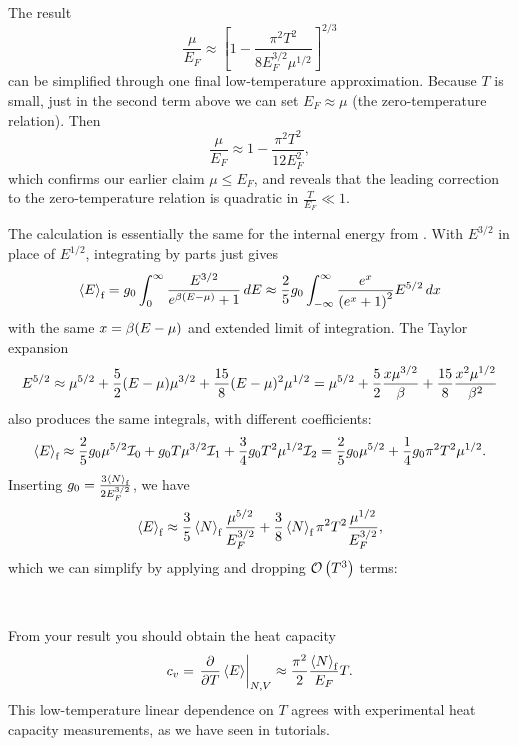 The result
\begin{equation*}
  \frac{\mu}{E_F} \approx \left[1 - \frac{\pi^2 T^2}{8 E_F^{3 / 2} \mu^{1 / 2}}\right]^{2 / 3}
\end{equation*}
can be simplified through one final low-temperature approximation.
Because $T$ is small, just in the second term above we can set $E_F \approx \mu$ (the zero-temperature relation).
Then
\begin{equation}
  \label{eq:mu_vs_T}
  \frac{\mu}{E_F} \approx 1 - \frac{\pi^2 T^2}{12 E_F^2},
\end{equation}
which confirms our earlier claim $\mu \leq E_F$, and reveals that the leading correction to the zero-temperature relation is quadratic in $\frac{T}{E_F} \ll 1$.

The calculation is essentially the same for the internal energy from .
With $E^{3 / 2}$ in place of $E^{1 / 2}$, integrating by parts just gives
\begin{equation*}
  \left\langle E \right\rangle_{\text{f}} = g_0 \int_0^{\infty} \frac{E^{3 / 2}}{e^{\beta(E - \mu)} + 1} \mathop{dE} \approx \frac{2}{5} g_0 \int_{-\infty}^{\infty} \frac{e^x}{\left(e^x + 1\right)^2} E^{5 / 2} \mathop{dx}
\end{equation*}
with the same $x = \beta(E - \mu)$ and extended limit of integration.
The Taylor expansion
\begin{equation*}
  E^{5 / 2} \approx \mu^{5 / 2} + \frac{5}{2} (E - \mu) \mu^{3 / 2} + \frac{15}{8} (E - \mu)^2 \mu^{1 / 2} = \mu^{5 / 2} + \frac{5}{2} \frac{x \mu^{3 / 2}}{\beta} + \frac{15}{8} \frac{x^2 \mu^{1 / 2}}{\beta^2}
\end{equation*}
also produces the same integrals, with different coefficients:
\begin{equation*}
  \left\langle E \right\rangle_{\text{f}} \approx \frac{2}{5} g_0 \mu^{5 / 2} \mathcal I_0 + g_0 T \mu^{3 / 2} \mathcal I_1 + \frac{3}{4} g_0 T^2 \mu^{1 / 2} \mathcal I_2 = \frac{2}{5} g_0 \mu^{5 / 2} + \frac{1}{4} g_0 \pi^2 T^2 \mu^{1 / 2}.
\end{equation*}
Inserting $g_0 = \frac{3\left\langle N \right\rangle_{\text{f}}}{2E_F^{3 / 2}}$, we have
\begin{equation*}
  \left\langle E \right\rangle_{\text{f}} \approx \frac{3}{5} \left\langle N \right\rangle_{\text{f}} \frac{\mu^{5 / 2}}{E_F^{3 / 2}} + \frac{3}{8} \left\langle N \right\rangle_{\text{f}} \pi^2 T^2 \frac{\mu^{1 / 2}}{E_F^{3 / 2}},
\end{equation*}
which we can simplify by applying  and dropping $\mathcal O\left(T^3\right)$ terms:
\begin{mdframed}
  \ \\[100 pt]
\end{mdframed}
From your result you should obtain the heat capacity
\begin{equation*}
  c_v = \left. \frac{\partial }{\partial T} \left\langle E \right\rangle \right|_{N,V} \approx \frac{\pi^2}{2} \frac{\left\langle N \right\rangle_{\text{f}}}{E_F} T.
\end{equation*}
This low-temperature linear dependence on $T$ agrees with experimental heat capacity measurements, as we have seen in tutorials.

